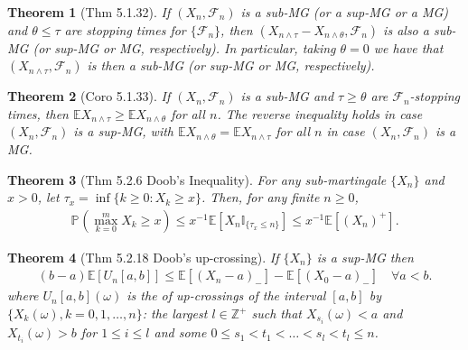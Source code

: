 \documentclass[11pt,a4paper]{article}
\numberwithin{equation}{section}%
\newtheorem{theorem}{Theorem}[]
\begin{document}
\begin{theorem}[Thm 5.1.32]
    If $(X_n, \mathcal{F}_n)$ is a sub-MG (or a sup-MG or a MG) and $\theta \leq \tau$ are stopping times for $\{\mathcal{F}_n\}$, then $(X_{n \wedge \tau }- X_{n \wedge \theta}, \mathcal{F}_n)$ is also a sub-MG (or sup-MG or MG, respectively). In particular, taking $\theta = 0$ we have that $(X_{n \wedge \tau}, \mathcal{F}_n)$ is then a sub-MG (or sup-MG or MG, respectively).
\end{theorem}

\begin{theorem}[Coro 5.1.33]
    If $(X_n, \mathcal{F}_n)$ is a sub-MG and $\tau \geq \theta$ are $\mathcal{F}_n$-stopping times, then $\mathbb{E}X_{n \wedge \tau} \geq \mathbb{E}X_{n \wedge \theta}$ for all $n$. The reverse inequality holds in case $(X_n, \mathcal{F}_n)$ is a sup-MG, with $\mathbb{E}X_{n \wedge \theta} = \mathbb{E}X_{n \wedge \tau}$ for all $n$ in case $(X_n, \mathcal{F}_n)$ is a MG.
\end{theorem}

\begin{theorem}[Thm 5.2.6 Doob's Inequality]
    For any sub-martingale $\{X_n\}$ and $x > 0$, let $\tau_x = \inf\{k \geq 0 : X_k \geq x\}$. Then, for any finite $n \geq 0$,
    \begin{align*}
        \mathbb{P}_{  }\left( \max_{k=0}^m X_k \geq x \right) \leq x^{-1} \mathbb{E}[X_n \mathbb{I}_{\{\tau_x \leq n\}}] \leq x^{-1} \mathbb{E}[(X_n)^+].
    \end{align*}
    
    
\end{theorem}


\begin{theorem}[Thm 5.2.18 Doob's up-crossing]
    If $\{X_n\}$ is a sup-MG then
    \begin{align*}
        (b - a) \mathbb{E}[U_n[a, b]] \leq \mathbb{E}[(X_n - a)_-] - \mathbb{E}[(X_0 - a)_-] \quad \forall a < b. 
    \end{align*}
    where $ U_n[a,b](\omega ) $ is the of up-crossings of the interval $[a,b]$ by $\{X_k(\omega), k = 0, 1, \ldots, n\}$: the largest $l \in \mathbb{Z}^+$ such that $X_{s_i}(\omega) < a$ and $X_{t_i}(\omega) > b$ for $1 \leq i \leq l$ and some $0 \leq s_1 < t_1 < \ldots < s_l < t_l \leq n$.
\end{theorem}
\end{document}
